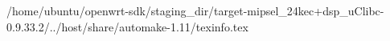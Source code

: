 /home/ubuntu/openwrt-sdk/staging_dir/target-mipsel_24kec+dsp_uClibc-0.9.33.2/../host/share/automake-1.11/texinfo.tex